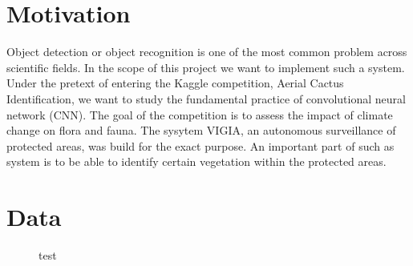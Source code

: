 \newcommand{\feat}{\texttt}







\section{Motivation}
Object detection or object recognition is one of the most common problem across scientific fields. In the scope of this project we want to implement such a system. Under the pretext of entering the Kaggle competition, Aerial Cactus Identification, we want to study the fundamental practice of convolutional neural network (CNN). The goal of the competition is to assess the impact of climate change on flora and fauna. The sysytem VIGIA, an autonomous surveillance of protected areas, was build for the exact purpose. An important part of such as system is to be able to identify certain vegetation within the protected areas.




\section{Data}


      \begin{figure}[!htb]
        \caption{\label{fig1} test \cite{whit}}
      \end{figure}
